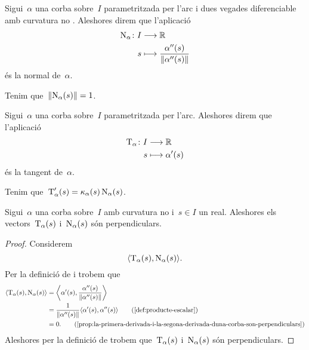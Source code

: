 \documentclass[../geometria-diferencial.tex]{subfiles}
\begin{document}
    \begin{definition}[Normal]
        \label{def:normal}
        Sigui~\(\alpha\) una corba sobre~\(I\) parametritzada per l'arc i dues vegades diferenciable amb curvatura no \nulla{}.
        Aleshores direm que l'aplicació
        \begin{align*}
            \normal_{\alpha}\colon I&\longrightarrow\mathbb{R} \\
            s&\longmapsto\frac{\alpha''(s)}{\norm{\alpha''(s)}}
        \end{align*}
        és la normal de~\(\alpha\).
    \end{definition}
    \begin{observation}
        \label{obs:la-normal-a-una-corba-es-unitaria}
        Tenim que~\(\norm{\normal_{\alpha}(s)}=1\).
    \end{observation}
    \begin{definition}[Tangent]
        \label{def:tangent}
        Sigui~\(\alpha\) una corba sobre~\(I\) parametritzada per l'arc.
        Aleshores direm que l'aplicació
        \begin{align*}
            \operatorname{T}_{\alpha}\colon I&\longrightarrow\mathbb{R} \\
            s&\longmapsto\alpha'(s)
        \end{align*}
        és la tangent de~\(\alpha\).
    \end{definition}
    \begin{observation}
        \label{obs:la-derivada-de-la-tangent-es-la-curvatura-per-la-normal}
        Tenim que~\(\operatorname{T}_{\alpha}'(s)=\operatorname{\kappa}_{\alpha}(s)\operatorname{N}_{\alpha}(s)\).
    \end{observation}
    \begin{proposition}
        \label{prop:la-tangent-i-la-normal-duna-corba-amb-curvatura-no-nula-son-perpendiculars}
        Sigui~\(\alpha\) una corba sobre~\(I\) amb curvatura no \nulla{} i~\(s\in I\) un real.
        Aleshores els vectors~\(\operatorname{T}_{\alpha}(s)\) i~\(\operatorname{N}_{\alpha}(s)\) són perpendiculars.
    \end{proposition}
    \begin{proof}
        Considerem
        \[
            \prodesc{\tangent_{\alpha}(s)}{\normal_{\alpha}(s)}.
        \]
        Per la definició de  i  trobem que
        \begin{align*}
            \prodesc{\tangent_{\alpha}(s)}{\normal_{\alpha}(s)}&=\prodesc[\bigg]{\alpha'(s)}{\frac{\alpha''(s)}{\norm{\alpha''(s)}}} \\
            &=\frac{1}{\norm{\alpha''(s)}}\prodesc{\alpha'(s)}{\alpha''(s)} \tag{\ref{def:producte-escalar}} \\
            &=0.
            \tag{\ref{prop:la-primera-derivada-i-la-segona-derivada-duna-corba-son-perpendiculars}}
        \end{align*}
        Aleshores per la definició de  trobem que~\(\operatorname{T}_{\alpha}(s)\) i~\(\operatorname{N}_{\alpha}(s)\) són perpendiculars.
    \end{proof}
\end{document}

